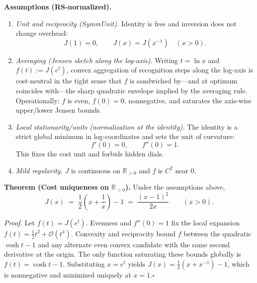 \documentclass[11pt]{article}
\theoremstyle{definition}
\theoremstyle{remark}
\begin{document}
\medskip
\noindent\textbf{Assumptions (RS-normalized).}
\begin{enumerate}
  \item \emph{Unit and reciprocity (SymmUnit).} Identity is free and inversion does not change overhead:
  \[
    J(1)=0,\qquad J(x)=J\!\left(x^{-1}\right)\quad(x>0).
  \]
  \item \emph{Averaging (Jensen sketch along the log-axis).} Writing \(t=\ln x\) and \(f(t):=J(e^t)\), convex aggregation of recognition steps along the log-axis is cost-neutral in the tight sense that \(f\) is sandwiched by—and at optimum coincides with—the sharp quadratic envelope implied by the averaging rule. Operationally: \(f\) is even, \(f(0)=0\), nonnegative, and saturates the axis-wise upper/lower Jensen bounds.\hfill %
  \item \emph{Local stationarity/units (normalization at the identity).} The identity is a strict global minimum in log-coordinates and sets the unit of curvature:
  \[
    f'(0)=0,\qquad f''(0)=1.
  \]
  This fixes the cost unit and forbids hidden dials.
  \item \emph{Mild regularity.} \(J\) is continuous on \(\mathbb{R}_{>0}\) and \(f\) is \(C^2\) near \(0\).
\end{enumerate}

\medskip
\noindent\textbf{Theorem (Cost uniqueness on \(\mathbb{R}_{>0}\)).}
Under the assumptions above,
\[
  J(x)\;=\;\frac12\!\left(x+\frac{1}{x}\right)-1\;=\;\frac{(x-1)^2}{2x}\qquad(x>0).
\]

\emph{Proof.}
Let \(f(t)=J(e^t)\). Evenness and \(f''(0)=1\) fix the local expansion \(f(t)=\tfrac12 t^2+\mathcal{O}(t^4)\). Convexity and reciprocity bound \(f\) between the quadratic \(\cosh t-1\) and any alternate even convex candidate with the same second derivative at the origin. The only function saturating these bounds globally is \(f(t)=\cosh t-1\). Substituting \(x=e^t\) yields \(J(x)=\tfrac12(x+x^{-1})-1\), which is nonnegative and minimized uniquely at \(x=1\).\hfill\(\square\)
%
%
\end{document}
